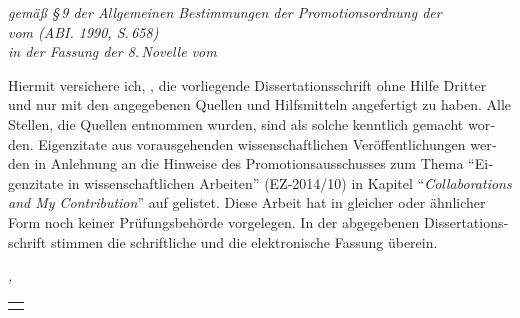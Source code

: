 
\begin{otherlanguage}{ngerman}



\begin{flushright}
    \emph{\small gemäß §\,9 der Allgemeinen Bestimmungen der Promotionsordnung der \\
    \myUni{} vom  (ABI. 1990, S.\,658) \\
    in der Fassung der 8.\,Novelle vom }
\end{flushright}
Hiermit versichere ich, \myName{}, die vorliegende Dissertationsschrift ohne Hilfe Dritter und nur mit den angegebenen Quellen und Hilfsmitteln angefertigt zu haben. Alle Stellen, die Quellen entnommen wurden, sind als solche kenntlich gemacht worden. Eigenzitate aus vorausgehenden wissenschaftlichen Veröffentlichungen werden in Anlehnung an die Hinweise des Promotionsausschusses \myFacultyDE{} zum Thema \enquote{Eigenzitate in wissenschaftlichen Arbeiten} (EZ-2014/10) in Kapitel \enquote{\emph{Collaborations and My Contribution}} auf  gelistet. Diese Arbeit hat in gleicher oder ähnlicher Form noch keiner Prüfungsbehörde vorgelegen. In der abgegebenen Dissertationsschrift stimmen die schriftliche und die elektronische Fassung überein.

\bigskip

\noindent\textit{\myLocation{}, \myTime{}}

\begin{flushright}
    \begin{tabular}{m{5cm}}
        \\ \hline
        \centering\myName{} \\
    \end{tabular}
\end{flushright}

\end{otherlanguage}
